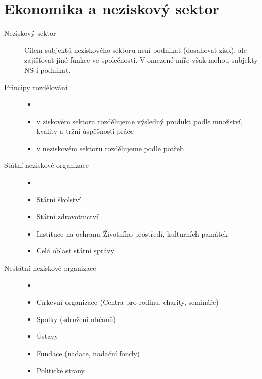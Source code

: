 \section*{Ekonomika a neziskový sektor}
    \begin{description}
        \item[Neziskový sektor] Cílem subjektů neziskového sektoru není podnikat (dosahovat zisk), ale zajišťovat jiné funkce ve společnosti. V omezené míře však mohou subjekty NS i podnikat.
        \item[Principy rozdělování]
            \begin{itemize}
                \item []
                \item v ziskovém sektoru rozdělujeme výsledný produkt podle množství, kvality a tržní úspěšnosti práce
                \item v neziskovém sektoru rozdělujeme podle potřeb
            \end{itemize}
        \item[Státní neziskové organizace]
            \begin{itemize}
                \item []
                \item Státní školství
                \item Státní zdravotnictví
                \item Instituce na ochranu Životního prostředí, kulturních památek
                \item Celá oblast státní správy
            \end{itemize}
        \item[Nestátní neziskové organizace]
            \begin{itemize}
                \item []
                \item Církevní organizace (Centra pro rodinu, charity, semináře)
                \item Spolky (sdružení občanů)
                \item Ústavy
                \item Fundace (nadace, nadační fondy)
                \item Politické strany
            \end{itemize}
    \end{description}
